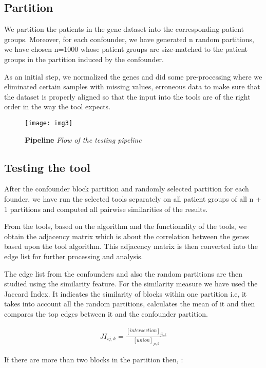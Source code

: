 \documentclass[a4paper]{paper}
\begin{document}
\subsection{Partition}
We partition the patients in the gene dataset into the corresponding patient groups. Moreover, for each confounder, we have generated n random partitions, we have chosen n=1000 whose patient groups are size-matched to the patient groups in the partition induced by the confounder. 

\bigskip
\noindent As an initial step, we normalized the genes and did some pre-processing where we eliminated certain samples with missing values, erroneous data to make sure that the dataset is properly aligned so that the input into the tools are of the right order in the way the tool expects. 


\begin{figure}[h!]
    \centering
    \texttt{[image: img3]}
    \caption{ \textbf{Pipeline} \textit{Flow of the testing pipeline}}
    \label{fig:my_label}
\end{figure}
\subsection{Testing the tool}
After the confounder block partition and randomly selected partition for each founder, we have run the selected tools separately on all patient groups of all n + 1 partitions and computed all pairwise similarities of the results.

\bigskip
\noindent From the tools, based on the algorithm and the functionality of the tools, we obtain the adjacency matrix which is about the correlation between the genes based upon the tool algorithm. This adjacency matrix is then converted into the edge list for further processing and analysis. 

\bigskip
\noindent The edge list from the confounders and also the random partitions are then studied using the similarity feature. For the similarity measure we have used the Jaccard Index. It indicates the similarity of blocks within one partition i.e, it takes into account all the random partitions, calculates the mean of it and then compares the top edges between it and the confounder partition. 

\begin{align}
JI_{ij,k} =\frac{\left[ intersection\right]_{ji,k}}{\left[ union\right]_{ji,k}}
\end{align}

If there are more than two blocks in the partition then, :
\end{document}
